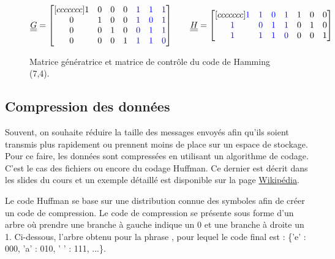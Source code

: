 \documentclass [a4paper, 11pt] {article}
\begin{document}
    \begin{figure}[H]
        \centering
        \begin{equation*}
            \underline{\underline{G}} =
            \begin{bmatrix}[ccccccc]
               1 & 0 & 0 & 0 & \color{blue} 1 & \color{blue} 1 & \color{blue} 1 \\
               0 & 1 & 0 & 0 & \color{blue} 1 & \color{blue} 0 & \color{blue} 1 \\
               0 & 0 & 1 & 0 & \color{blue} 0 & \color{blue} 1 & \color{blue} 1 \\
               0 & 0 & 0 & 1 & \color{blue} 1 & \color{blue} 1 & \color{blue} 0 \\
            \end{bmatrix}
            \hspace{.7cm}
            \underline{\underline{H}} =
            \begin{bmatrix}[ccccccc]
               \color{blue} 1 & \color{blue} 1 & \color{blue} 0 & \color{blue} 1 & 1 & 0 & 0 \\
               \color{blue} 1 & \color{blue} 0 & \color{blue} 1 & \color{blue} 1 & 0 & 1 & 0 \\
               \color{blue} 1 & \color{blue} 1 & \color{blue} 1 & \color{blue} 0 & 0 & 0 & 1 \\
            \end{bmatrix}
        \end{equation*}
        \caption{Matrice génératrice et matrice de contrôle du code de Hamming (7,4).}
        \label{fig:generatrice_encodage_hamming_7_4}
    \end{figure}
    
    \subsection*{Compression des données}
    
    Souvent, on souhaite réduire la taille des messages envoyés afin qu'ils soient transmis plus rapidement ou prennent moins de place sur un espace de stockage. Pour ce faire, les données sont compressées en utilisant un algorithme de codage. C'est le cas des fichiers  ou encore du codage Huffman. Ce dernier est décrit dans les slides du cours et un exemple détaillé est disponible sur la page \href{https://fr.wikipedia.org/wiki/Codage_de_Huffman#Principe}{Wikipédia}.
    
    Le code Huffman se base sur une distribution connue des symboles afin de créer un code de compression. Le code de compression se présente sous forme d'un arbre où prendre une branche à gauche indique un 0 et une branche à droite un 1. Ci-dessous, l'arbre obtenu pour la phrase , pour lequel le code final est : \{'e' : 000, 'a' : 010, ' ' : 111, ...\}.
    
\end{document}

